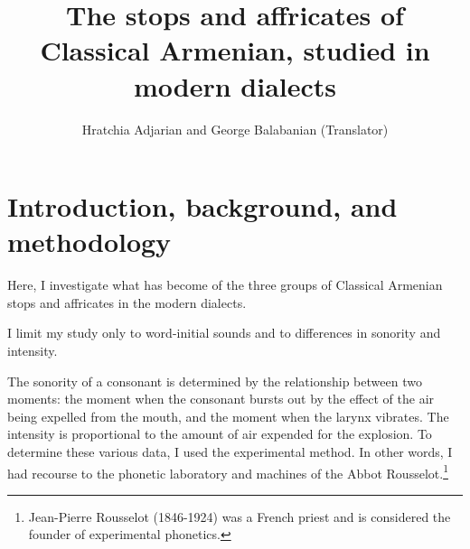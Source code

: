 \documentclass[output=paper]{langscibook}
\author{Hratchia Adjarian\affiliation{} and George Balabanian (Translator)\affiliation{University of Pennsylvania}}
\title{The stops and affricates of Classical Armenian, studied in modern dialects}
\begin{document}
\maketitle\label{chapter:George}
\section{Introduction, background, and methodology}

Here, I investigate what has become of the three groups of Classical Armenian stops and affricates in the modern dialects.




\begin{table}[H]
\end{table}


I limit my study only to word-initial sounds and to differences in sonority and intensity.

The sonority of a consonant is determined by the relationship between two moments: the moment when the consonant bursts out by the effect of the air being expelled from the mouth, and the moment when the larynx vibrates. The intensity is proportional to the amount of air expended for the explosion. To determine these various data, I used the experimental method. In other words, I had recourse to the phonetic laboratory and machines of the Abbot Rousselot.\footnote{Jean-Pierre Rousselot (1846-1924) was a French priest and is considered the founder of experimental phonetics.}
\end{document}
